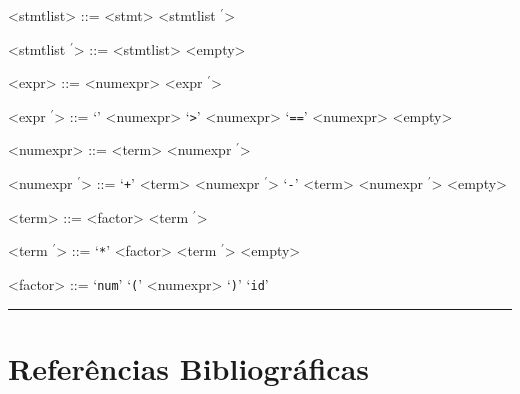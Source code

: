 \documentclass[12pt]{article}
\newcommand{\pprime}{\ensuremath{^{\prime}}}
\begin{document}
\begin{multicols}{2}
\begin{grammar}
<stmtlist> ::= <stmt> <stmtlist \pprime>

<stmtlist \pprime> ::= <stmtlist> 
  \alt <empty>

<expr> ::= <numexpr> <expr \pprime>

<expr \pprime> ::= ‘\texttt{}’ <numexpr>
  \alt ‘\texttt{>}’ <numexpr>
  \alt ‘\texttt{==}’ <numexpr>
  \alt <empty>

<numexpr> ::= <term> <numexpr \pprime>

<numexpr \pprime> ::= ‘\texttt{+}’ <term> <numexpr \pprime>
  \alt ‘\texttt{-}’ <term> <numexpr \pprime>
  \alt <empty>

<term> ::= <factor> <term \pprime>

<term \pprime> ::= ‘\texttt{*}’ <factor> <term \pprime>
  \alt <empty>

<factor> ::= ‘\texttt{num}’
  \alt ‘\texttt{(}’ <numexpr> ‘\texttt{)}’
  \alt ‘\texttt{id}’
\end{grammar}
\end{multicols}

\noindent\rule{\textwidth}{0.2pt}

\newpage
\section{Referências Bibliográficas}


\end{document}

